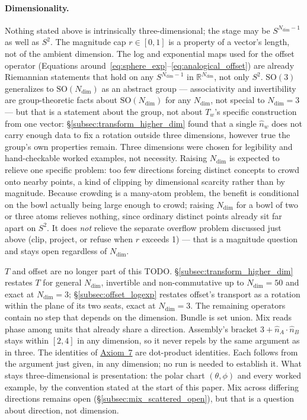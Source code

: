 \documentclass[12pt, a4paper]{article}
\begin{document}
\paragraph{Dimensionality.}
\label{subsec:dimensionality_open}
Nothing stated
above is intrinsically three-dimensional; the stage may be
$S^{N_{\mathrm{dim}}-1}$ as well as $S^2$. The magnitude cap
$r\in[0,1]$ is a property of a vector's length, not of the ambient
dimension. The log and exponential maps used for the offset operator
(Equations around~\eqref{eq:sphere_exp}--\eqref{eq:analogical_offset})
are already Riemannian statements that hold on any $S^{N_{\mathrm{dim}}-1}$ in
$\mathbb{R}^{N_{\mathrm{dim}}}$, not only $S^2$. $\mathrm{SO}(3)$ generalizes to
$\mathrm{SO}(N_{\mathrm{dim}})$ as an abstract group --- associativity and
invertibility are group-theoretic facts about $\mathrm{SO}(N_{\mathrm{dim}})$ for
any $N_{\mathrm{dim}}$, not special to $N_{\mathrm{dim}}=3$ --- but that is a statement about the
group, not about $T_w$'s specific construction from one vector:
\S\ref{subsec:transform_higher_dim} found that a single $\hat n_w$
does not carry enough data to fix a rotation outside three
dimensions, however true the group's own properties remain. Three
dimensions were chosen for legibility and hand-checkable worked
examples, not necessity. Raising $N_{\mathrm{dim}}$ is expected to relieve one
specific problem: too few directions forcing distinct concepts to
crowd onto nearby points, a kind of clipping by dimensional scarcity
rather than by magnitude. Because crowding is a many-atom problem, the
benefit is conditional on the bowl actually being large enough to
crowd; raising $N_{\mathrm{dim}}$ for a bowl of two or three atoms relieves nothing,
since ordinary distinct points already sit far apart on $S^2$. It does
\emph{not} relieve the separate
overflow problem discussed just above (clip, project, or refuse when
$r$ exceeds 1) --- that is a magnitude question and stays open
regardless of $N_{\mathrm{dim}}$.

$T$ and offset are no longer part of this TODO.
\S\ref{subsec:transform_higher_dim} restates $T$ for general
$N_{\mathrm{dim}}$, invertible and non-commutative up to
$N_{\mathrm{dim}}=50$ and exact at $N_{\mathrm{dim}}=3$;
\S\ref{subsec:offset_logexp} restates offset's transport as a
rotation within the plane of its two seats, exact at
$N_{\mathrm{dim}}=3$. The remaining operators contain no step that
depends on the dimension. Bundle is set union. Mix reads phase among
units that already share a direction. Assembly's bracket
$3+\hat n_A\cdot\hat n_B$ stays within $[2,4]$ in any dimension, so it
never repels by the same argument as in three. The identities of
\hyperref[subsec:axiom_v1_metrics]{Axiom~7} are dot-product
identities. Each follows from the argument just given, in any
dimension; no run is needed to establish it. What stays three-dimensional is presentation: the
polar chart $(\theta,\phi)$ and every worked example, by the
convention stated at the start of this paper. Mix across differing
directions remains open (\S\ref{subsec:mix_scattered_open}), but
that is a question about direction, not dimension.
\end{document}
